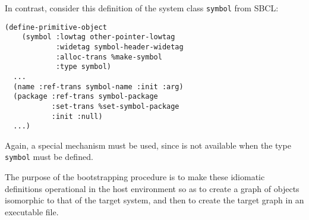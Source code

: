 In contrast, consider this definition of the system class
\texttt{symbol} from SBCL:

\begin{verbatim}
(define-primitive-object
    (symbol :lowtag other-pointer-lowtag
            :widetag symbol-header-widetag
            :alloc-trans %make-symbol
            :type symbol)
  ...
  (name :ref-trans symbol-name :init :arg)
  (package :ref-trans symbol-package
           :set-trans %set-symbol-package
           :init :null)
  ...)
\end{verbatim}

\noindent
Again, a special mechanism must be used, since \clos{} is not
available when the type \texttt{symbol} must be defined.

The purpose of the \sicl{} bootstrapping procedure is to make these
idiomatic definitions operational in the host environment so as to
create a graph of objects isomorphic to that of the target system, and
then to create the target graph in an executable file.
